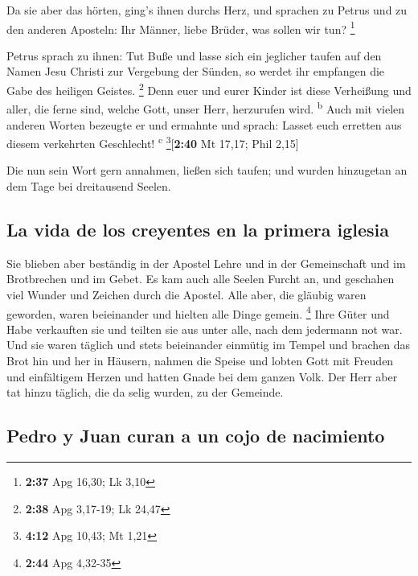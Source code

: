  Da sie aber das hörten, ging's ihnen durchs Herz, und
sprachen zu Petrus und zu den anderen Aposteln: Ihr Männer, liebe
Brüder, was sollen wir tun? \footnote{\textbf{2:37} Apg 16,30; Lk 3,10}

 Petrus sprach zu ihnen: Tut Buße und lasse sich ein
jeglicher taufen auf den Namen Jesu Christi zur Vergebung der Sünden, so
werdet ihr empfangen die Gabe des heiligen Geistes. \footnote{\textbf{2:38}
  Apg 3,17-19; Lk 24,47}  Denn euer und eurer Kinder ist
diese Verheißung und aller, die ferne sind, welche Gott, unser Herr,
herzurufen wird. \textsuperscript{b}  Auch mit vielen
anderen Worten bezeugte er und ermahnte und sprach: Lasset euch erretten
aus diesem verkehrten Geschlecht! \textsuperscript{c}
\footnote{\textbf{4:12} Apg 10,43; Mt 1,21}{[}\textbf{2:40} Mt 17,17;
Phil 2,15{]}

 Die nun sein Wort gern annahmen, ließen sich taufen; und
wurden hinzugetan an dem Tage bei dreitausend Seelen.

\hypertarget{la-vida-de-los-creyentes-en-la-primera-iglesia}{%
\subsection{La vida de los creyentes en la primera
iglesia}\label{la-vida-de-los-creyentes-en-la-primera-iglesia}}

 Sie blieben aber beständig in der Apostel Lehre und in
der Gemeinschaft und im Brotbrechen und im Gebet.  Es kam
auch alle Seelen Furcht an, und geschahen viel Wunder und Zeichen durch
die Apostel.  Alle aber, die gläubig waren geworden,
waren beieinander und hielten alle Dinge gemein. \footnote{\textbf{2:44}
  Apg 4,32-35}  Ihre Güter und Habe verkauften sie und
teilten sie aus unter alle, nach dem jedermann not war. 
Und sie waren täglich und stets beieinander einmütig im Tempel und
brachen das Brot hin und her in Häusern,  nahmen die
Speise und lobten Gott mit Freuden und einfältigem Herzen und hatten
Gnade bei dem ganzen Volk. Der Herr aber tat hinzu täglich, die da selig
wurden, zu der Gemeinde.

\hypertarget{pedro-y-juan-curan-a-un-cojo-de-nacimiento}{%
\subsection{Pedro y Juan curan a un cojo de
nacimiento}\label{pedro-y-juan-curan-a-un-cojo-de-nacimiento}}

